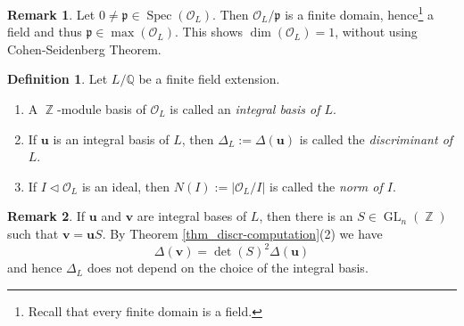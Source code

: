 \documentclass[12pt,a4paper]{report}
\theoremstyle{definition}
\newtheorem{defn}[theorem]{Definition}
\newtheorem*{remark}{Remark}
\theoremstyle{num.custom-title}
\DeclareMathOperator{\Z}{\mathbb{Z}}
\DeclareMathOperator{\Spec}{Spec}
\DeclareMathOperator{\GL}{GL}
\newcommand{\Q}{\mathbb{Q}}
\newcommand{\p}{\mathfrak{p}}
\renewcommand{\O}{\mathcal{O}}
\renewcommand{\u}{\mathbf{u}}
\begin{document}
\begin{remark}
Let $0 \neq \p \in \Spec(\O_L)$. Then $\O_L/\p$ is a finite domain, hence\footnote{Recall that every finite domain is a field.} a field and thus $\p \in \max(\O_L)$. This shows $\dim(\O_L)=1$, without using Cohen-Seidenberg Theorem.
\end{remark}

\begin{defn}
Let $L/\Q$ be a finite field extension.
\begin{enumerate}
\item A $\Z$-module basis of $\O_L$ is called an \emph{integral basis of $L$}.
\item If $\u$ is an integral basis of $L$, then $\Delta_L := \Delta(\u)$ is called the \emph{discriminant of $L$}.
\item If $I \lhd \O_L$ is an ideal, then $N(I) := |\O_L/I|$ is called the \emph{norm of $I$}.
\end{enumerate}
\end{defn}

\begin{remark}
If $\u$ and $\mathbf{v}$ are integral bases of $L$, then there is an $S \in \GL_n(\Z)$ such that $\mathbf{v}=\u S$. By Theorem \ref{thm_discr-computation}(2) we have
\[
\Delta(\mathbf{v}) = \det(S)^2 \Delta(\u)
\]
and hence $\Delta_L$ does not depend on the choice of the integral basis.
\end{remark}
\end{document}
